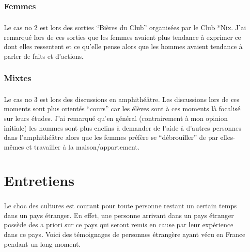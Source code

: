 \subsection{Femmes}

\paragraph{} Le cas no 2 est lors des sorties “Bières du Club” organisées par
le Club *Nix.  J'ai remarqué lors de ces sorties que les femmes avaient plus
tendance à exprimer ce dont elles ressentent et ce qu'elle pense alors que les
hommes avaient tendance à parler de faits et d'actions.

\subsection{Mixtes}

\paragraph{} Le cas no 3 est lors des discussions en amphithéâtre. Les
discussions lors de ces moments sont plus orientés “cours” car les élèves sont
à ces moments là focalisé sur leurs études. J'ai remarqué qu'en général
(contrairement à mon opinion initiale) les hommes sont plus enclins à demander
de l'aide à d'autres personnes dans l'amphithéâtre alors que les femmes préfère
se “débrouiller” de par elles-mêmes et travailler à la maison/appartement.

\chapter{Entretiens}

\paragraph{} Le choc des cultures est courant pour toute personne restant un
certain temps dans un pays étranger. En effet, une personne arrivant dans un
pays étranger possède des a priori sur ce pays qui seront remis en cause par
leur expérience dans ce pays. Voici des témoignages de personnes étrangère
ayant vécu en France pendant un long moment.

